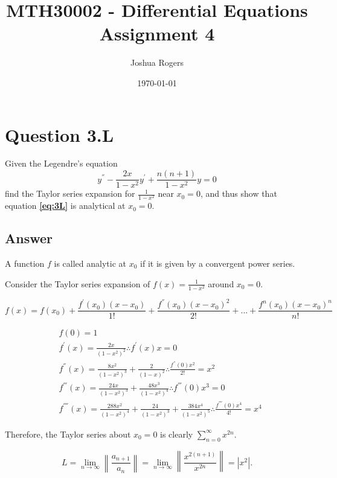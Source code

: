 \documentclass{article}
\title{\vspace{-4cm}MTH30002 - Differential Equations Assignment 4}
\author{Joshua Rogers}
\date\today
\begin{document}
\maketitle 

\section*{Question 3.L}
Given the Legendre's equation
\begin{equation}\label{eq:3L}
y^{''}-\frac{2x}{1-x^2}y^{'}+\frac{n(n+1)}{1-x^2}y=0
\end{equation}
find the Taylor series expansion for $\frac{1}{1-x^{2}}$ near $x_0 = 0$, and thus show that equation \textbf{\ref{eq:3L}} is analytical at $x_0 = 0$.


\subsection*{Answer}

A function $f$ is called analytic at $x_0$ if it is given by a convergent power series.

Consider the Taylor series expansion of $f(x) = \frac{1}{1-x^2}$ around $x_0 = 0$.

\begin{equation}
f(x) = f(x_0) + \frac{f^{'}(x_0)(x-x_0)}{1!} + \frac{f^{''}(x_0)(x-x_0)^{2}}{2!} + ... + \frac{f^{n}(x_0)(x-x_0)^{n}}{n!}
\end{equation}

\begin{align*}
&f(0) = 1\\
&f^{'}(x) = \frac{2x}{(1-x^2)^2} \therefore f^{'}(x)x = 0\\
&f^{''}(x) = \frac{8x^2}{(1-x^2)^3}+\frac{2}{(1-x)^2} \therefore \frac{f^{''}(0)x^2}{2!} = x^2\\
&f^{'''}(x) = \frac{24x}{(1-x^2)^3} + \frac{48x^3}{(1-x^2)^4} \therefore f^{'''}(0)x^3 = 0\\
&f^{''''}(x) = \frac{288x^2}{(1-x^2)^4}+\frac{24}{(1-x^2)^3}+\frac{384x^4}{(1-x^2)^5} \therefore \frac{f^{''''}(0)x^4}{4!} = x^4
\end{align*}



Therefore, the Taylor series about $x_0 = 0$ is clearly $\sum_{n=0}^{\infty} x^{2n}$.

\begin{equation}\label{limits1}
L = \lim_{n\to\infty} \left\| \frac{a_{n+1}}{a_n} \right\| = \lim_{n\to\infty}\left\|\frac{x^{2(n+1)}}{x^{2n}}\right\| = \left|x^2\right|. 
\end{equation}
\end{document}
